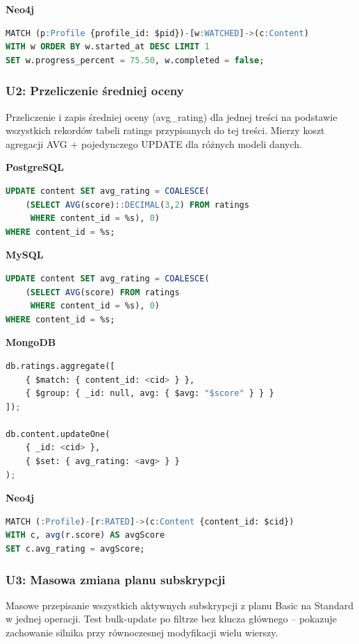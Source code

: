 \textbf{Neo4j}
\begin{lstlisting}[language=SQL]
MATCH (p:Profile {profile_id: $pid})-[w:WATCHED]->(c:Content)
WITH w ORDER BY w.started_at DESC LIMIT 1
SET w.progress_percent = 75.50, w.completed = false;
\end{lstlisting}


\subsubsection{U2: Przeliczenie średniej oceny}

Przeliczenie i zapis średniej oceny (avg\_rating) dla jednej treści na podstawie
wszystkich rekordów tabeli ratings przypisanych do tej treści. Mierzy koszt
agregacji AVG + pojedynczego UPDATE dla różnych modeli danych.

\textbf{PostgreSQL}
\begin{lstlisting}[language=SQL]
UPDATE content SET avg_rating = COALESCE(
    (SELECT AVG(score)::DECIMAL(3,2) FROM ratings
     WHERE content_id = %s), 0)
WHERE content_id = %s;
\end{lstlisting}

\textbf{MySQL}
\begin{lstlisting}[language=SQL]
UPDATE content SET avg_rating = COALESCE(
    (SELECT AVG(score) FROM ratings
     WHERE content_id = %s), 0)
WHERE content_id = %s;
\end{lstlisting}

\textbf{MongoDB}
\begin{lstlisting}[language=Python]
db.ratings.aggregate([
    { $match: { content_id: <cid> } },
    { $group: { _id: null, avg: { $avg: "$score" } } }
]);

db.content.updateOne(
    { _id: <cid> },
    { $set: { avg_rating: <avg> } }
);
\end{lstlisting}

\textbf{Neo4j}
\begin{lstlisting}[language=SQL]
MATCH (:Profile)-[r:RATED]->(c:Content {content_id: $cid})
WITH c, avg(r.score) AS avgScore
SET c.avg_rating = avgScore;
\end{lstlisting}


\subsubsection{U3: Masowa zmiana planu subskrypcji}

Masowe przepisanie wszystkich aktywnych subskrypcji z planu Basic na Standard
w jednej operacji. Test bulk-update po filtrze bez klucza głównego -- pokazuje
zachowanie silnika przy równoczesnej modyfikacji wielu wierszy.

